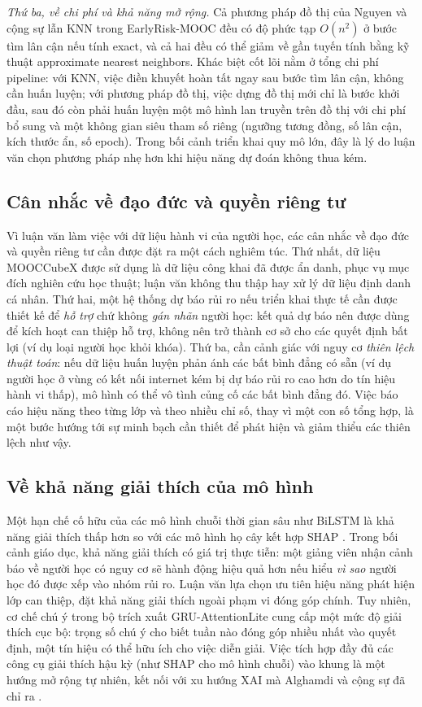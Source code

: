 \textit{Thứ ba, về chi phí và khả năng mở rộng.} Cả phương pháp đồ thị của Nguyen và cộng sự lẫn KNN trong EarlyRisk-MOOC đều có độ phức tạp $O(n^2)$ ở bước tìm lân cận nếu tính exact, và cả hai đều có thể giảm về gần tuyến tính bằng kỹ thuật approximate nearest neighbors. Khác biệt cốt lõi nằm ở tổng chi phí pipeline: với KNN, việc điền khuyết hoàn tất ngay sau bước tìm lân cận, không cần huấn luyện; với phương pháp đồ thị, việc dựng đồ thị mới chỉ là bước khởi đầu, sau đó còn phải huấn luyện một mô hình lan truyền trên đồ thị với chi phí bổ sung và một không gian siêu tham số riêng (ngưỡng tương đồng, số lân cận, kích thước ẩn, số epoch). Trong bối cảnh triển khai quy mô lớn, đây là lý do luận văn chọn phương pháp nhẹ hơn khi hiệu năng dự đoán không thua kém.

\subsection{Cân nhắc về đạo đức và quyền riêng tư}

Vì luận văn làm việc với dữ liệu hành vi của người học, các cân nhắc về đạo đức và quyền riêng tư cần được đặt ra một cách nghiêm túc. Thứ nhất, dữ liệu MOOCCubeX được sử dụng là dữ liệu công khai đã được ẩn danh, phục vụ mục đích nghiên cứu học thuật; luận văn không thu thập hay xử lý dữ liệu định danh cá nhân. Thứ hai, một hệ thống dự báo rủi ro nếu triển khai thực tế cần được thiết kế để \emph{hỗ trợ} chứ không \emph{gán nhãn} người học: kết quả dự báo nên được dùng để kích hoạt can thiệp hỗ trợ, không nên trở thành cơ sở cho các quyết định bất lợi (ví dụ loại người học khỏi khóa). Thứ ba, cần cảnh giác với nguy cơ \emph{thiên lệch thuật toán}: nếu dữ liệu huấn luyện phản ánh các bất bình đẳng có sẵn (ví dụ người học ở vùng có kết nối internet kém bị dự báo rủi ro cao hơn do tín hiệu hành vi thấp), mô hình có thể vô tình củng cố các bất bình đẳng đó. Việc báo cáo hiệu năng theo từng lớp và theo nhiều chỉ số, thay vì một con số tổng hợp, là một bước hướng tới sự minh bạch cần thiết để phát hiện và giảm thiểu các thiên lệch như vậy.

\subsection{Về khả năng giải thích của mô hình}

Một hạn chế cố hữu của các mô hình chuỗi thời gian sâu như BiLSTM là khả năng giải thích thấp hơn so với các mô hình họ cây kết hợp SHAP \cite{Dass2021,Bettahi2025}. Trong bối cảnh giáo dục, khả năng giải thích có giá trị thực tiễn: một giảng viên nhận cảnh báo về người học có nguy cơ sẽ hành động hiệu quả hơn nếu hiểu \emph{vì sao} người học đó được xếp vào nhóm rủi ro. Luận văn lựa chọn ưu tiên hiệu năng phát hiện lớp can thiệp, đặt khả năng giải thích ngoài phạm vi đóng góp chính. Tuy nhiên, cơ chế chú ý trong bộ trích xuất GRU-AttentionLite cung cấp một mức độ giải thích cục bộ: trọng số chú ý cho biết tuần nào đóng góp nhiều nhất vào quyết định, một tín hiệu có thể hữu ích cho việc diễn giải. Việc tích hợp đầy đủ các công cụ giải thích hậu kỳ (như SHAP cho mô hình chuỗi) vào khung là một hướng mở rộng tự nhiên, kết nối với xu hướng XAI mà Alghamdi và cộng sự đã chỉ ra \cite{Alghamdi2025}.

